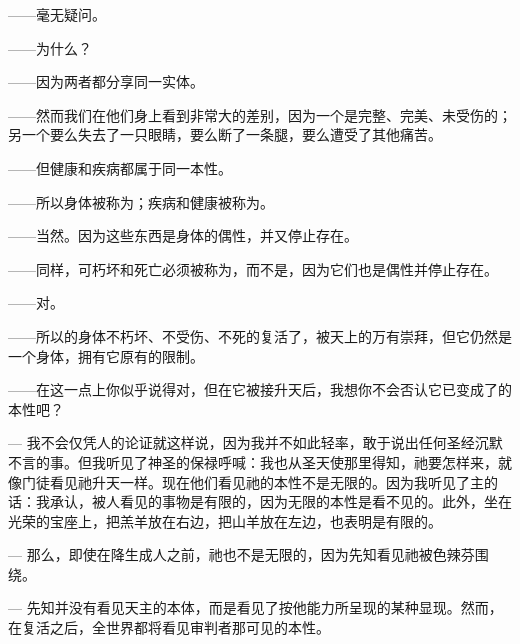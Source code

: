 ——毫无疑问。\par

——为什么？\par

——因为两者都分享同一实体。\par

——然而我们在他们身上看到非常大的差别，因为一个是完整、完美、未受伤的；另一个要么失去了一只眼睛，要么断了一条腿，要么遭受了其他痛苦。\par

——但健康和疾病都属于同一本性。\par

——所以身体被称为；疾病和健康被称为。\par

——当然。因为这些东西是身体的偶性，并又停止存在。\par

——同样，可朽坏和死亡必须被称为，而不是，因为它们也是偶性并停止存在。\par

——对。\par

——所以的身体不朽坏、不受伤、不死的复活了，被天上的万有崇拜，但它仍然是一个身体，拥有它原有的限制。\par

——在这一点上你似乎说得对，但在它被接升天后，我想你不会否认它已变成了的本性吧？\par

— 我不会仅凭人的论证就这样说，因为我并不如此轻率，敢于说出任何圣经沉默不言的事。但我听见了神圣的保禄呼喊：我也从圣天使那里得知，祂要怎样来，就像门徒看见祂升天一样。现在他们看见祂的本性不是无限的。因为我听见了主的话：我承认，被人看见的事物是有限的，因为无限的本性是看不见的。此外，坐在光荣的宝座上，把羔羊放在右边，把山羊放在左边，也表明是有限的。\par

— 那么，即使在降生成人之前，祂也不是无限的，因为先知看见祂被色辣芬围绕。\par

— 先知并没有看见天主的本体，而是看见了按他能力所呈现的某种显现。然而，在复活之后，全世界都将看见审判者那可见的本性。\par

